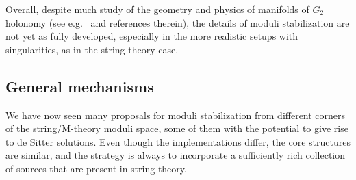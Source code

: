 \documentclass[12pt,a4wide]{article}
\begin{document}
Overall, despite much study of the geometry and physics of manifolds of $G_2$ holonomy (see e.g.~\cite{Joycebook,Atiyah:2001qf,Acharya:2001gy,Halverson:2014tya,Halverson:2015vta,Braun:2016igl} and references therein), the details of moduli stabilization  are not yet as fully developed, especially in the more realistic setups with singularities, as in the string theory case. 


\subsection{General mechanisms}\label{sec:genmech}

We have now seen many proposals for moduli stabilization from different corners of the string/M-theory moduli space, some of them with the potential to give rise to de Sitter solutions.
Even though the implementations differ, the core structures are similar,
and the strategy is always to incorporate a sufficiently rich collection of sources that are present in string theory.
\end{document}
